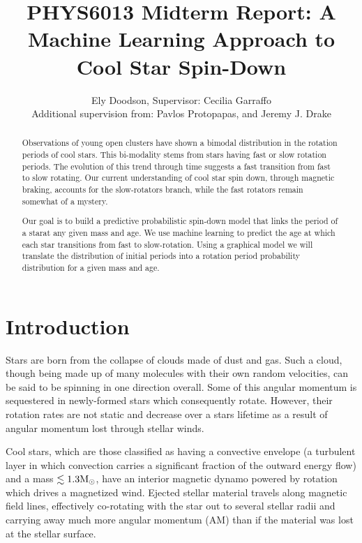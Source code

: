 \documentclass[fleqn,usenatbib]{mnras}
\title{PHYS6013 Midterm Report: A Machine Learning Approach to Cool Star Spin-Down}
\author[E. Doodson et al.]{
Ely Doodson,
 Supervisor: Cecilia Garraffo \\
Additional supervision from: Pavlos Protopapas,
and Jeremy J. Drake
}
\begin{document}
\label{firstpage}
\pagerange{\pageref{firstpage}--\pageref{lastpage}}
\maketitle

\begin{abstract}
	Observations of young open clusters have shown a bimodal distribution in the rotation
	periods of cool stars.
	This bi-modality stems from stars having fast or slow rotation periods.
	The evolution of this trend through time suggests a fast transition from fast to slow rotating.
	Our current understanding of cool star spin down, through magnetic braking, accounts for the slow-rotators branch, while the fast rotators remain somewhat of a mystery.

	Our goal is to build a predictive probabilistic spin-down model that links the period of a starat any given mass and age.
	We use machine learning to predict the age at which each star transitions from fast to slow-rotation.
	Using a graphical model we will translate the distribution of initial periods into a rotation period probability distribution for a given mass and age.
\end{abstract}


\section{Introduction}
Stars are born from the collapse of clouds made of dust and gas.
Such a cloud, though being made up of many molecules with their own random velocities, can be said to be spinning in one direction overall.
Some of this angular momentum is sequestered in newly-formed stars which consequently rotate.
However, their rotation rates are not static and decrease over a stars lifetime as a result of angular momentum lost through stellar winds.

Cool stars, which are those classified as having a convective envelope (a turbulent layer in which convection carries a significant fraction of the outward energy flow) and a mass $\lesssim 1.3 \textup{M}_\odot$, have an interior magnetic dynamo powered by rotation which drives a magnetized wind. Ejected stellar material travels along magnetic field lines, effectively co-rotating with the star out to several stellar radii and carrying away much more angular momentum (AM) than if the material was lost at the stellar surface. 
\end{document}

